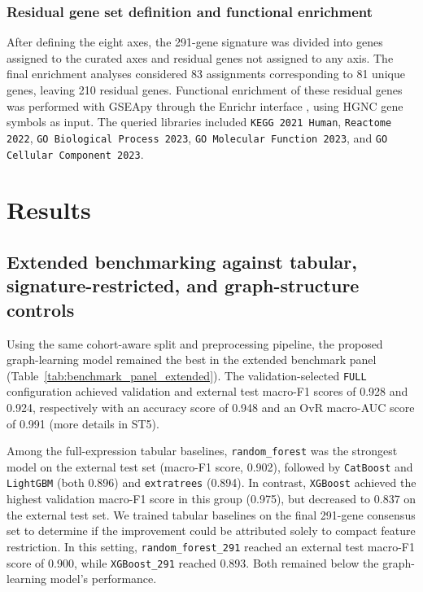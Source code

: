 \documentclass[unnumsec,webpdf,modern,large]{oup-authoring-template}
\newcounter{panel}
\begin{document}
\subsubsection{Residual gene set definition and functional enrichment} 
After defining the eight axes, the 291-gene signature was divided into genes assigned to the curated axes and residual genes not assigned to any axis. The final enrichment analyses considered 83 assignments corresponding to 81 unique genes, leaving 210 residual genes. Functional enrichment of these residual genes was performed with GSEApy through the Enrichr interface \citep{Fang2023GSEApy,Kuleshov2016Enrichr}, using HGNC gene symbols as input. The queried libraries included \texttt{KEGG 2021 Human}, \texttt{Reactome 2022}, \texttt{GO Biological Process 2023}, \texttt{GO Molecular Function 2023}, and \texttt{GO Cellular Component 2023}.

\section{Results}
\subsection{Extended benchmarking against tabular, signature-restricted, and graph-structure controls}
Using the same cohort-aware split and preprocessing pipeline, the proposed graph-learning model remained the best in the extended benchmark panel (Table~\ref{tab:benchmark_panel_extended}). The validation-selected \texttt{FULL} configuration achieved validation and external test macro-F1 scores of 0.928 and 0.924, respectively with an accuracy score of 0.948 and an OvR macro-AUC score of 0.991 (more details in ST5).

Among the full-expression tabular baselines, \texttt{random\_forest} was the strongest model on the external test set (macro-F1 score, 0.902), followed by \texttt{CatBoost} and \texttt{LightGBM} (both 0.896) and \texttt{extratrees} (0.894). In contrast, \texttt{XGBoost} achieved the highest validation macro-F1 score in this group (0.975), but decreased to 0.837 on the external test set. We trained tabular baselines on the final 291-gene consensus set to determine if the improvement could be attributed solely to compact feature restriction. In this setting, \texttt{random\_forest\_291} reached an external test macro-F1 score of 0.900, while \texttt{XGBoost\_291} reached 0.893. Both remained below the graph-learning model's performance.
\end{document}
